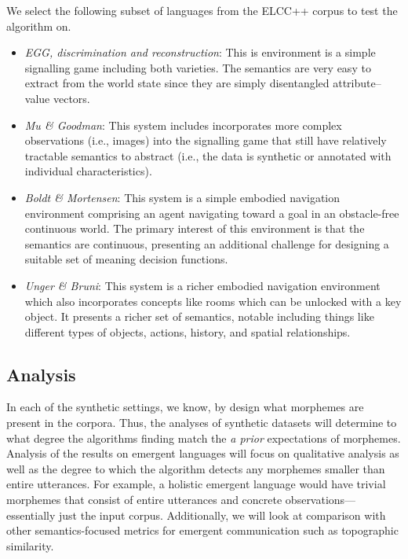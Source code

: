 We select the following subset of languages from the ELCC++ corpus to test the algorithm on.
\begin{itemize}
  \item \emph{EGG, discrimination and reconstruction}:
    This is environment is a simple signalling game including both varieties.
    The semantics are very easy to extract from the world state since they are simply disentangled attribute--value vectors.
  \item \emph{Mu \& Goodman}:
    This system includes incorporates more complex observations (i.e., images) into the signalling game that still have relatively tractable semantics to abstract (i.e., the data is synthetic or annotated with individual characteristics).
  \item \emph{Boldt \& Mortensen}:
    This system is a simple embodied navigation environment comprising an agent navigating toward a goal in an obstacle-free continuous world.
    The primary interest of this environment is that the semantics are continuous, presenting an additional challenge for designing a suitable set of meaning decision functions.
  \item \emph{Unger \& Bruni}:
    This system is a richer embodied navigation environment which also incorporates concepts like rooms which can be unlocked with a key object.
    It presents a richer set of semantics, notable including things like different types of objects, actions, history, and spatial relationships.
\end{itemize}


\subsection{Analysis}

In each of the synthetic settings, we know, by design what morphemes are present in the corpora.
Thus, the analyses of synthetic datasets will determine to what degree the algorithms finding match the \emph{a prior} expectations of morphemes.
Analysis of the results on emergent languages will focus on qualitative analysis as well as the degree to which the algorithm detects any morphemes smaller than entire utterances.
For example, a holistic emergent language would have trivial morphemes that consist of entire utterances and concrete observations---essentially just the input corpus.
Additionally, we will look at comparison with other semantics-focused metrics for emergent communication such as topographic similarity.

